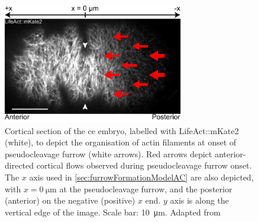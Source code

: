 \begin{figure}[h]
    \centering
    \includegraphics[width=0.7\textwidth]{ActiveMatterModel/FigureModelAC/pcFurrowXYAxis.pdf}
    \caption[Cartesian coordinate system used in model for Pseudocleavage furrow formation]{Cortical section of the \acs{ce} embryo, labelled with LifeAct::mKate2 (white), to depict the organisation of actin filaments at onset of pseudocleavage furrow (white arrows). Red arrows depict anterior-directed cortical flows observed during pseudocleavage furrow onset. The $x$ axis used in \autoref{sec:furrowFormationModelAC} are also depicted, with $x = \SI{0}{\micro\meter}$ at the pseudocleavage furrow, and the posterior (anterior) on the negative (positive) $x$ end. $y$ axis is along the vertical edge of the image. Scale bar: \SI{10}{\micro\meter}. Adapted from \cite{reymann2016cortical}}
    \label{fig:pcFurrowXYAxisModelAC}
\end{figure}

